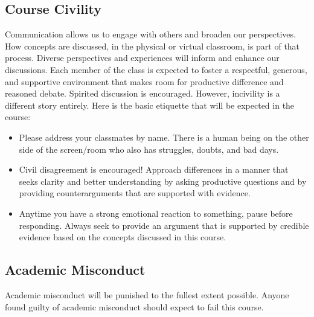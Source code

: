 \documentclass[
  letterpaper,
]{article}
\providecommand{\tightlist}{%
  \setlength{\itemsep}{0pt}\setlength{\parskip}{0pt}}\usepackage{longtable,booktabs,array}
\begin{document}
\subsection{Course Civility}\label{course-civility}

Communication allows us to engage with others and broaden our
perspectives. How concepts are discussed, in the physical or virtual
classroom, is part of that process. Diverse perspectives and experiences
will inform and enhance our discussions. Each member of the class is
expected to foster a respectful, generous, and supportive environment
that makes room for productive difference and reasoned debate. Spirited
discussion is encouraged. However, incivility is a different story
entirely. Here is the basic etiquette that will be expected in the
course:

\begin{itemize}
\tightlist
\item
  Please address your classmates by name. There is a human being on the
  other side of the screen/room who also has struggles, doubts, and bad
  days.
\item
  Civil disagreement is encouraged! Approach differences in a manner
  that seeks clarity and better understanding by asking productive
  questions and by providing counterarguments that are supported with
  evidence.
\item
  Anytime you have a strong emotional reaction to something, pause
  before responding. Always seek to provide an argument that is
  supported by credible evidence based on the concepts discussed in this
  course.
\end{itemize}

\subsection{Academic Misconduct}\label{academic-misconduct}

\begin{tcolorbox}[enhanced jigsaw, left=2mm, toptitle=1mm, opacitybacktitle=0.6, leftrule=.75mm, title=\textcolor{quarto-callout-warning-color}{\faExclamationTriangle}\hspace{0.5em}{Warning}, colback=white, colframe=quarto-callout-warning-color-frame, toprule=.15mm, rightrule=.15mm, coltitle=black, arc=.35mm, bottomtitle=1mm, colbacktitle=quarto-callout-warning-color!10!white, breakable, bottomrule=.15mm, titlerule=0mm, opacityback=0]

Academic misconduct will be punished to the fullest extent possible.
Anyone found guilty of academic misconduct should expect to fail this
course.

\end{tcolorbox}
\end{document}
